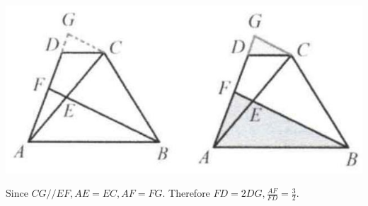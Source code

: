 \documentclass{article}
\begin{document}
\begin{center}
\includegraphics[width=\textwidth]{images/136(3).jpg}
\end{center}

Since \(C G / / E F, A E=E C, A F=F G\). Therefore \(F D=2 D G, \frac{A F}{F D}=\frac{3}{2}\).
\end{document}
